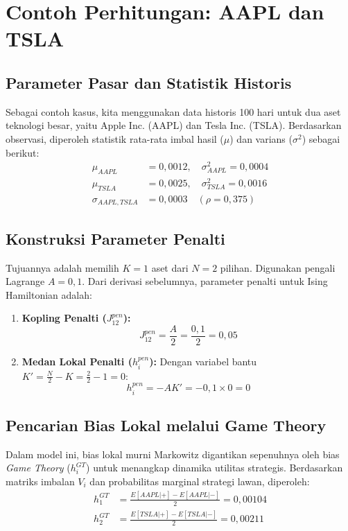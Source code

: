 \section{Contoh Perhitungan: AAPL dan TSLA}

\subsection{Parameter Pasar dan Statistik Historis}
Sebagai contoh kasus, kita menggunakan data historis 100 hari untuk dua aset teknologi besar, yaitu Apple Inc. (AAPL) dan Tesla Inc. (TSLA). Berdasarkan observasi, diperoleh statistik rata-rata imbal hasil ($\mu$) dan varians ($\sigma^2$) sebagai berikut:
\begin{align}
\mu_{AAPL} &= 0,0012, \quad \sigma_{AAPL}^2 = 0,0004 \\
\mu_{TSLA} &= 0,0025, \quad \sigma_{TSLA}^2 = 0,0016 \\
\sigma_{AAPL,TSLA} &= 0,0003 \quad (\rho = 0,375)
\end{align}

\subsection{Konstruksi Parameter Penalti}
Tujuannya adalah memilih $K=1$ aset dari $N=2$ pilihan. Digunakan pengali Lagrange $A=0,1$. Dari derivasi sebelumnya, parameter penalti untuk Ising Hamiltonian adalah:
\begin{enumerate}
    \item \textbf{Kopling Penalti ($J_{12}^{pen}$):}
    \begin{equation}
    J_{12}^{pen} = \frac{A}{2} = \frac{0,1}{2} = 0,05
    \end{equation}
    \item \textbf{Medan Lokal Penalti ($h_i^{pen}$):}
    Dengan variabel bantu $K' = \frac{N}{2} - K = \frac{2}{2} - 1 = 0$:
    \begin{equation}
    h_i^{pen} = -A K' = -0,1 \times 0 = 0
    \end{equation}
\end{enumerate}

\subsection{Pencarian Bias Lokal melalui Game Theory}
Dalam model ini, bias lokal murni Markowitz digantikan sepenuhnya oleh bias \textit{Game Theory} ($h_i^{GT}$) untuk menangkap dinamika utilitas strategis. Berdasarkan matriks imbalan $V_i$ dan probabilitas marginal strategi lawan, diperoleh:
\begin{align}
h_1^{GT} &= \frac{E[AAPL|+] - E[AAPL|-]}{2} = 0,00104 \\
h_2^{GT} &= \frac{E[TSLA|+] - E[TSLA|-]}{2} = 0,00211
\end{align}

